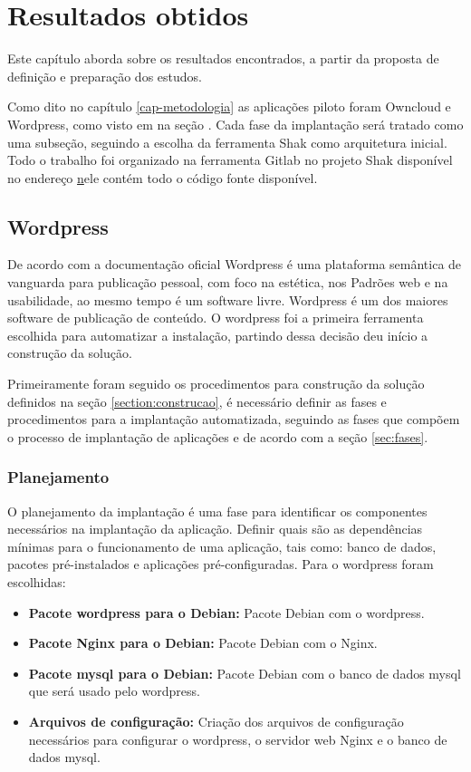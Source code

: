 \chapter{Resultados obtidos}
\label{cap-resultados}

Este capítulo aborda sobre os resultados encontrados, a partir da proposta de
definição e preparação dos estudos. 

Como dito no capítulo \ref{cap-metodologia}
as aplicações piloto foram Owncloud e
Wordpress, como visto em na seção \label{subsection:validacao}. Cada fase da implantação
será tratado como uma subseção, seguindo a 
escolha da ferramenta Shak como arquitetura inicial. Todo o trabalho foi 
organizado na ferramenta Gitlab no projeto Shak disponível no endereço 
\href{https://gitlab.com/Shak/Shak/} nele contém todo o código fonte disponível.

\section{Wordpress}
\label{sub:wordpress}

De acordo com a documentação oficial \cite{wordpress} Wordpress é uma plataforma
semântica de vanguarda para publicação pessoal, com foco na estética, nos
Padrões web e na usabilidade, ao mesmo tempo é um software livre. Wordpress é
um dos maiores software de publicação de conteúdo. O
wordpress foi a primeira ferramenta escolhida para automatizar a instalação, partindo
dessa decisão deu início a construção da solução.

Primeiramente foram seguido os procedimentos para construção da solução definidos 
na seção \ref{section:construcao}, é
necessário definir as fases e procedimentos para a implantação automatizada,
seguindo as fases que compõem o processo de implantação de aplicações e de acordo
com a seção \ref{sec:fases}.

\subsection{Planejamento}

O planejamento da implantação é uma fase para identificar os componentes
necessários na implantação da aplicação. Definir quais são as dependências mínimas
para o funcionamento de uma aplicação, tais como: banco de dados, pacotes
pré-instalados e aplicações pré-configuradas. Para o wordpress foram escolhidas:

\begin{itemize}
   \item \textbf{Pacote wordpress para o Debian:} Pacote Debian com o wordpress.
   \item \textbf{Pacote Nginx para o Debian:} Pacote Debian com o Nginx.
   \item \textbf{Pacote mysql para o Debian:} Pacote Debian com o banco de dados mysql
   que será usado pelo wordpress.
   \item \textbf{Arquivos de configuração:} Criação dos arquivos de configuração
   necessários para configurar o wordpress, o servidor web Nginx e o banco de dados
   mysql.
\end{itemize}


